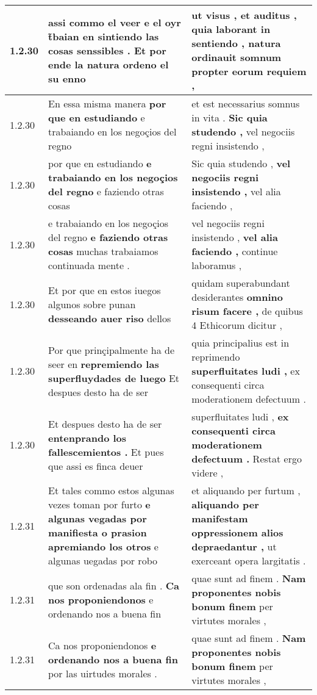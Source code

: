 \begin{tabular}{|p{1cm}|p{6.5cm}|p{6.5cm}|}
1.2.30 & assi commo el veer \textbf{ e el oyr t̃baian en sintiendo las cosas senssibles . } Et por ende la natura ordeno el su enno & ut visus , et auditus , \textbf{ quia laborant in sentiendo , } natura ordinauit somnum propter eorum requiem , \\\hline
1.2.30 & En essa misma manera \textbf{ por que en estudiando } e trabaiando en los negoçios del regno & et est necessarius somnus in vita . \textbf{ Sic quia studendo , } vel negociis regni insistendo , \\\hline
1.2.30 & por que en estudiando \textbf{ e trabaiando en los negoçios del regno } e faziendo otras cosas & Sic quia studendo , \textbf{ vel negociis regni insistendo , } vel alia faciendo , \\\hline
1.2.30 & e trabaiando en los negoçios del regno \textbf{ e faziendo otras cosas } muchas trabaiamos continuada mente . & vel negociis regni insistendo , \textbf{ vel alia faciendo , } continue laboramus , \\\hline
1.2.30 & Et por que en estos iuegos algunos sobre punan \textbf{ desseando auer riso } dellos & quidam superabundant desiderantes \textbf{ omnino risum facere , } de quibus 4 Ethicorum dicitur , \\\hline
1.2.30 & Por que prinçipalmente ha de seer en \textbf{ repremiendo las superfluydades de luego } Et despues desto ha de ser & quia principalius est in reprimendo \textbf{ superfluitates ludi , } ex consequenti circa moderationem defectuum . \\\hline
1.2.30 & Et despues desto ha de ser \textbf{ entenprando los fallescemientos . } Et pues que assi es finca deuer & superfluitates ludi , \textbf{ ex consequenti circa moderationem defectuum . } Restat ergo videre , \\\hline
1.2.31 & Et tales commo estos algunas vezes toman por furto \textbf{ e algunas vegadas por manifiesta o prasion apremiando los otros } e algunas uegadas por robo & et aliquando per furtum , \textbf{ aliquando per manifestam oppressionem alios depraedantur , } ut exerceant opera largitatis . \\\hline
1.2.31 & que son ordenadas ala fin . \textbf{ Ca nos proponiendonos } e ordenando nos a buena fin & quae sunt ad finem . \textbf{ Nam proponentes nobis bonum finem } per virtutes morales , \\\hline
1.2.31 & Ca nos proponiendonos \textbf{ e ordenando nos a buena fin } por las uirtudes morales . & quae sunt ad finem . \textbf{ Nam proponentes nobis bonum finem } per virtutes morales , \\\hline

\end{tabular}
